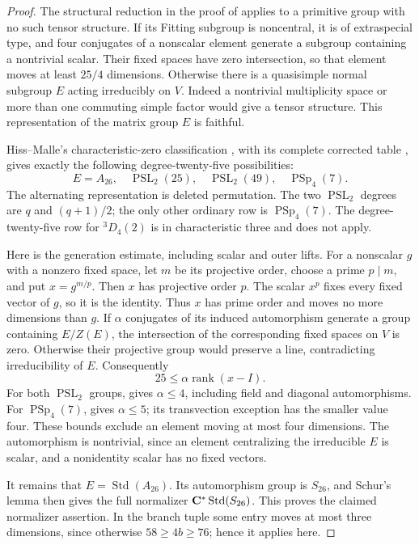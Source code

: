 \begin{proof}
The structural reduction in the proof of
\cite[Theorem~7.1, p.~549]{GS} applies to a primitive group with no
such tensor structure. If its Fitting subgroup is noncentral, it is
of extraspecial type, and four conjugates of a nonscalar element
 generate a subgroup containing a nontrivial scalar. Their fixed
spaces have zero intersection, so that element moves at least
$25/4$ dimensions. Otherwise there is a quasisimple normal subgroup
$E$ acting irreducibly on $V$. Indeed a nontrivial multiplicity space
or more than one commuting simple factor would give a tensor
structure. This representation of the matrix group $E$ is faithful.

Hiss--Malle's characteristic-zero classification
\cite[Theorem~1 and Table~2, pp.~22 and 31]{HissMalle}, with its
complete corrected table \cite[pp.~95--96 and 102]{HissMalleCorrection},
gives exactly the following degree-twenty-five possibilities:
\[
 E=A_{26},\quad \operatorname{PSL}_2(25),\quad
 \operatorname{PSL}_2(49),\quad \operatorname{PSp}_4(7).
\]
The alternating representation is deleted permutation. The two
$\operatorname{PSL}_2$ degrees are $q$ and $(q+1)/2$; the only other
ordinary row is $\operatorname{PSp}_4(7)$. The degree-twenty-five row
for ${}^3D_4(2)$ is in characteristic three and does not apply.

Here is the generation estimate, including scalar and outer lifts.
For a nonscalar $g$ with a nonzero fixed space, let $m$ be its
projective order, choose a prime $p\mid m$, and put $x=g^{m/p}$.
Then $x$ has projective order $p$. The scalar $x^p$ fixes every fixed
vector of $g$, so it is the identity. Thus $x$ has prime order and
moves no more dimensions than $g$. If $\alpha$ conjugates of its
induced automorphism generate a group containing $E/Z(E)$, the
intersection of the corresponding fixed spaces on $V$ is zero.
Otherwise their projective group would preserve a line, contradicting
irreducibility of $E$. Consequently
\[
 25\le\alpha\operatorname{rank}(x-I).
\]
For both $\operatorname{PSL}_2$ groups,
\cite[Lemma~3.1, pp.~527--529]{GS} gives $\alpha\le4$, including
field and diagonal automorphisms. For $\operatorname{PSp}_4(7)$,
\cite[Theorem~4.3, p.~533]{GS} gives $\alpha\le5$; its transvection
exception has the smaller value four. These bounds exclude an
 element moving at most four dimensions. The automorphism is
nontrivial, since an element centralizing the irreducible $E$ is
scalar, and a nonidentity scalar has no fixed vectors.

It remains that $E=\operatorname{Std}(A_{26})$. Its automorphism group
is $S_{26}$, and Schur's lemma then gives the full normalizer
$\mathbf C^*\operatorname{Std}(S_{26})$. This proves the claimed normalizer
assertion. In the branch tuple some entry moves at most three
 dimensions, since otherwise $58\ge4b\ge76$; hence it applies here.


\end{proof}

